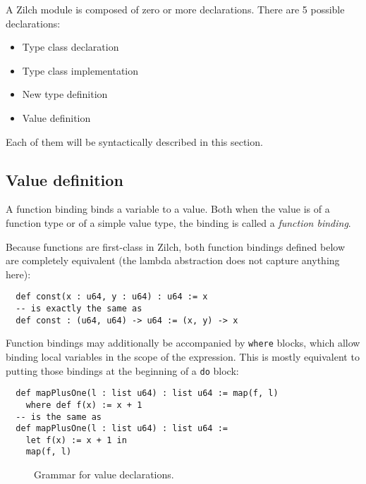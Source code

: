 A Zilch module is composed of zero or more declarations.
There are 5 possible declarations:
\begin{itemize}
  \item Type class declaration
  \item Type class implementation
  \item New type definition
  \item Value definition
\end{itemize}

\noindent Each of them will be syntactically described in this section.

\subsection{Value definition}\label{subsec:zilch-grammar-declarations-value}

A function binding binds a variable to a value.
Both when the value is of a function type or of a simple value type, the binding is called a \textit{function binding}.
\vspace*{\baselineskip}

Because functions are first-class in Zilch, both function bindings defined below are completely equivalent (the lambda abstraction does not capture anything here):

\noindent\begin{verbatim}
  def const(x : u64, y : u64) : u64 := x
  -- is exactly the same as
  def const : (u64, u64) -> u64 := (x, y) -> x
\end{verbatim}
\vspace*{\baselineskip}

Function bindings may additionally be accompanied by \verb|where| blocks, which allow binding local variables in the scope of the expression.
This is mostly equivalent to putting those bindings at the beginning of a \verb|do| block:

\noindent\begin{verbatim}
  def mapPlusOne(l : list u64) : list u64 := map(f, l)
    where def f(x) := x + 1
  -- is the same as
  def mapPlusOne(l : list u64) : list u64 :=
    let f(x) := x + 1 in
    map(f, l)
\end{verbatim}

\begin{figure}[H]
  \centering


  \caption{Grammar for value declarations.}
  \label{fig:zilch-grammar-declarations-value-grammar}
\end{figure}

